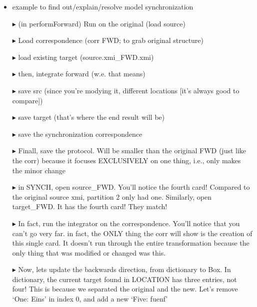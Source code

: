 \begin{itemize}

\item example to find out/explain/resolve model synchronization
  
\item[$\blacktriangleright$] (in performForward) Run on the original (load source)
  
\item[$\blacktriangleright$] Load correspondence (corr FWD; to grab original structure)
    
\item[$\blacktriangleright$] load existing target (source.xmi\_FWD.xmi)

\item[$\blacktriangleright$] then, integrate forward (w.e. that means)

\item[$\blacktriangleright$] save src (since you're modying it, different locations [it's always good to compare])

\item[$\blacktriangleright$] save target (that's where the end result will be)

\item[$\blacktriangleright$] save the synchronization correspondence

\item[$\blacktriangleright$] Finall, save the protocol. Will be smaller than the original FWD (just like the corr) because it focuses EXCLUSIVELY on one thing,
i.e., only makes the minor change

\item[$\blacktriangleright$] in SYNCH, open source\_FWD. You'll notice the fourth card! Compared to the original source xmi, partition 2 only had one.
Similarly, open target\_FWD. It has the fourth card! They match!

\item[$\blacktriangleright$] In fact, run the integrator on the correspondence. You'll notice that you can't go very far. in fact, the ONLY thing the corr will
show is the creation of this single card. It doesn't run through the entire transformation because the only thing that was modified or changed was this.

\item[$\blacktriangleright$] Now, lets update the backwards direction, from dictionary to Box. In dictionary, the current target found in LOCATION has three
entries, not four! This is because we separated the original and the new. Let's remove `One: Eins' in index 0, and add a new `Five: fuenf'


\end{itemize}
